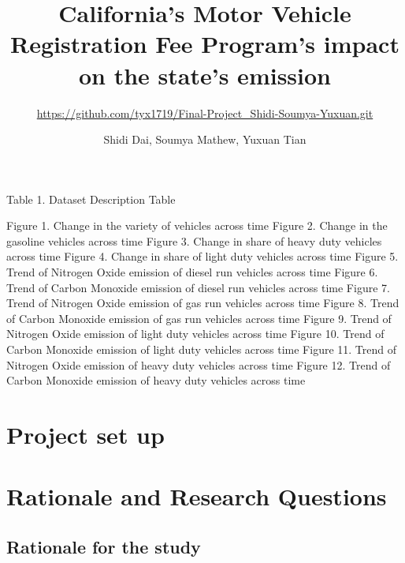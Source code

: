 \documentclass[
  12pt,
]{article}
\title{California's Motor Vehicle Registration Fee Program's impact on
the state's emission}
\subtitle{\url{https://github.com/tyx1719/Final-Project_Shidi-Soumya-Yuxuan.git}}
\author{Shidi Dai, Soumya Mathew, Yuxuan Tian}
\date{}
\begin{document}
\maketitle

\newpage
\tableofcontents 
\newpage
\listoftables

Table 1. Dataset Description Table \newpage

\listoffigures

Figure 1. Change in the variety of vehicles across time Figure 2. Change
in the gasoline vehicles across time Figure 3. Change in share of heavy
duty vehicles across time Figure 4. Change in share of light duty
vehicles across time Figure 5. Trend of Nitrogen Oxide emission of
diesel run vehicles across time Figure 6. Trend of Carbon Monoxide
emission of diesel run vehicles across time Figure 7. Trend of Nitrogen
Oxide emission of gas run vehicles across time Figure 8. Trend of Carbon
Monoxide emission of gas run vehicles across time Figure 9. Trend of
Nitrogen Oxide emission of light duty vehicles across time Figure 10.
Trend of Carbon Monoxide emission of light duty vehicles across time
Figure 11. Trend of Nitrogen Oxide emission of heavy duty vehicles
across time Figure 12. Trend of Carbon Monoxide emission of heavy duty
vehicles across time \newpage

\hypertarget{project-set-up}{%
\section{Project set up}\label{project-set-up}}

\hypertarget{rationale-and-research-questions}{%
\section{Rationale and Research
Questions}\label{rationale-and-research-questions}}

\hypertarget{rationale-for-the-study}{%
\subsection{Rationale for the study}\label{rationale-for-the-study}}
\end{document}
